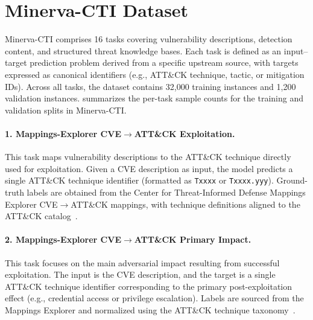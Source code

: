 
\section{Minerva-CTI Dataset}
\label{sec:minerva-datasets}

Minerva-CTI comprises 16 tasks covering vulnerability descriptions, detection content, and structured threat knowledge bases. Each task is defined as an input--target prediction problem derived from a specific upstream source, with targets expressed as canonical identifiers (e.g., ATT\&CK technique, tactic, or mitigation IDs). Across all tasks, the dataset contains 32{,}000 training instances and 1{,}200 validation instances.  summarizes the per-task sample counts for the training and validation splits in Minerva-CTI.



\paragraph{1. Mappings-Explorer CVE$\rightarrow$ATT\&CK Exploitation.}
This task maps vulnerability descriptions to the ATT\&CK technique directly used for exploitation. Given a CVE description as input, the model predicts a single ATT\&CK technique identifier (formatted as \texttt{Txxxx} or \texttt{Txxxx.yyy}). Ground-truth labels are obtained from the Center for Threat-Informed Defense Mappings Explorer CVE$\rightarrow$ATT\&CK mappings, with technique definitions aligned to the ATT\&CK catalog~\citep{mappings_explorer,mitre_attack}.

\paragraph{2. Mappings-Explorer CVE$\rightarrow$ATT\&CK Primary Impact.}
This task focuses on the main adversarial impact resulting from successful exploitation. The input is the CVE description, and the target is a single ATT\&CK technique identifier corresponding to the primary post-exploitation effect (e.g., credential access or privilege escalation). Labels are sourced from the Mappings Explorer and normalized using the ATT\&CK technique taxonomy~\citep{mappings_explorer,mitre_attack}.

